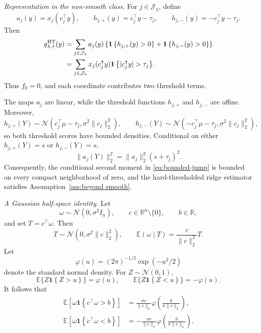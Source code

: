 \documentclass[12pt]{article}
\def\calN{\mathcal{N}}
\newcommand{\tran}{^\intercal}
\newcommand{\Indc}[1]{{\mathbf{1}\left\{{#1}\right\}}}
\theoremstyle{general}
\begin{document}
\medskip\noindent
\emph{Representation in the non-smooth class.}
For \(j\in\mathcal J_{\lambda}\), define
\begin{equation*}
a_j(y)=x_j(c_j\tran y),
\qquad
h_{j,+}(y)=c_j\tran y-\tau_j,
\qquad
h_{j,-}(y)=-c_j\tran y-\tau_j.
\end{equation*}
Then
\begin{align}
\label{eq:hard-thresholded-ridge-piecewise}
g^{\mathrm{HT}}_{\lambda,\tau}(y)
&=
\sum_{j\in\mathcal J_{\lambda}}
a_j(y)
\left\{
\Indc{h_{j,+}(y)>0}
+
\Indc{h_{j,-}(y)>0}
\right\}
\notag\\
&=
\sum_{j\in\mathcal J_{\lambda}}
x_j(c_j\tran y)\Indc{|c_j\tran y|>\tau_j}.
\end{align}
Thus \(f_0=0\), and each coordinate contributes two threshold terms.

The maps \(a_j\) are linear, while the threshold functions
\(h_{j,+}\) and \(h_{j,-}\) are affine. Moreover,
\[
h_{j,+}(Y)
\sim
\calN(c_j\tran\mu-\tau_j,\sigma^2\|c_j\|_2^2),
\qquad
h_{j,-}(Y)
\sim
\calN(-c_j\tran\mu-\tau_j,\sigma^2\|c_j\|_2^2),
\]
so both threshold scores have bounded densities. Conditional on either
\(h_{j,+}(Y)=s\) or \(h_{j,-}(Y)=s\),
\begin{equation*}
\|a_j(Y)\|_2^2
=
\|x_j\|_2^2(s+\tau_j)^2.
\end{equation*}
Consequently, the conditional second moment in
\eqref{eq:bounded-jump} is bounded on every compact neighborhood of
zero, and the hard-thresholded ridge estimator satisfies
Assumption~\ref{ass:beyond smooth}.

\medskip\noindent
\emph{A Gaussian half-space identity.}
Let
\[
\omega\sim\calN(0,\sigma^2I_n),
\qquad
c\in\mathbb R^n\setminus\{0\},
\qquad
b\in\mathbb R,
\]
and set \(T=c\tran\omega\). Then
\[
T\sim\calN(0,\sigma^2\|c\|_2^2),
\qquad
\mathbb E(\omega\mid T)
=
\frac{c}{\|c\|_2^2}T.
\]
Let
\[
\varphi(u)
=
(2\pi)^{-1/2}\exp(-u^2/2)
\]
denote the standard normal density. For \(Z\sim\calN(0,1)\),
\[
\mathbb E\{Z\Indc{Z>u}\}
=
\varphi(u),
\qquad
\mathbb E\{Z\Indc{Z<u}\}
=
-\varphi(u).
\]
It follows that
\begin{align}
\label{eq:gaussian-upper-halfspace-moment}
\mathbb E\!\left[
\omega\Indc{c\tran\omega>b}
\right]
&=
\frac{\sigma c}{\|c\|_2}
\varphi\!\left(
\frac{b}{\sigma\|c\|_2}
\right),
\\
\label{eq:gaussian-lower-halfspace-moment}
\mathbb E\!\left[
\omega\Indc{c\tran\omega<b}
\right]
&=
-\frac{\sigma c}{\|c\|_2}
\varphi\!\left(
\frac{b}{\sigma\|c\|_2}
\right).
\end{align}
\end{document}
